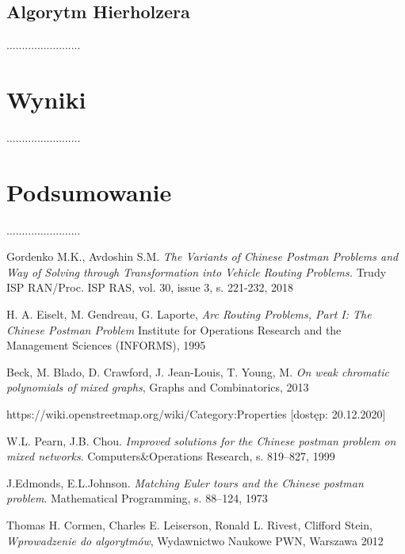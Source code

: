 \documentclass[a4paper, 12pt, twoside, openright]{article}
\begin{document}
\subsection{Algorytm Hierholzera}
\indent\par
........................




\newpage
\section{Wyniki}
\par\indent
........................



\newpage
\section{Podsumowanie}
\indent\par
........................



\newpage
\begin{thebibliography}{99}
	
		Gordenko M.K., Avdoshin S.M. \textit{The Variants of Chinese Postman Problems and Way of Solving through Transformation into Vehicle Routing Problems.} Trudy ISP RAN/Proc. ISP RAS, vol. 30, issue 3, s. 221-232, 2018
	
		H. A. Eiselt, M. Gendreau, G. Laporte, \textit{Arc Routing Problems, Part I: The Chinese Postman Problem}  Institute for Operations Research and the Management Sciences (INFORMS), 1995
	
	Beck, M. Blado, D. Crawford, J. Jean-Louis, T. Young, M. \textit{On weak chromatic polynomials of mixed graphs}, Graphs and Combinatorics, 2013

	 https://wiki.openstreetmap.org/wiki/Category:Properties [dostęp: 20.12.2020]	

	 W.L. Pearn, J.B. Chou. \textit{Improved solutions for the Chinese postman problem on mixed networks}. Computers\&Operations Research, s. 819–827, 1999
	
	 J.Edmonds, E.L.Johnson.  \textit{Matching Euler tours and the Chinese postman problem}. Mathematical Programming, s. 88–124, 1973
	
		Thomas H. Cormen, Charles E. Leiserson, Ronald L. Rivest, Clifford Stein, \textit{Wprowadzenie do algorytmów}, Wydawnictwo Naukowe PWN, Warszawa 2012




\end{thebibliography}	
\end{document}
